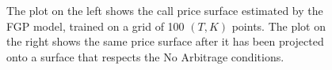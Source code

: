 \documentclass[a4paper,12pt]{article}
\begin{document}
\begin{figure}[H]
\begin{minipage}[c]{.45\linewidth}
    \centering
\end{minipage} \hfill
\begin{minipage}[c]{.45\linewidth}
    \centering
\end{minipage}
\caption{The plot on the left shows the call price surface estimated by the FGP model, trained on a grid of 100 $(T, K)$ points. The plot on the right shows the same price surface after it has been projected onto a surface that respects the No Arbitrage conditions.}
\label{fig:2d_na_conditions}
\end{figure}
\end{document}
